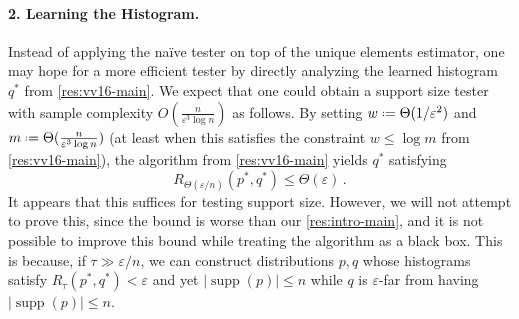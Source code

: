 \documentclass[10pt,a4paper]{article}
\newcommand*\ie{i.\kern.1em e.\ }
\newcommand{\ignore}[1]{}
\DeclareMathOperator{\supp}{supp}   %
\newcommand*{\define}{\mathrel{\vcenter{\baselineskip0.5ex \lineskiplimit0pt
                      \hbox{\scriptsize.}\hbox{\scriptsize.}}}%
                      =}
\renewcommand{\epsilon}{\varepsilon}
\begin{document}
\paragraph*{2. Learning the Histogram.} Instead of applying the na\"ive tester on
top of the unique elements estimator, one may hope for a more efficient tester by directly analyzing
the learned histogram $q^*$ from \cref{res:vv16-main}. We expect that one could obtain a support
size tester with sample complexity $O(\frac{n}{\epsilon^3 \log n})$ as follows. By setting $w
\define \Theta(1/\epsilon^2)$ and $m \define \Theta(\frac{n}{\epsilon^3 \log n})$ (at least when
this satisfies the constraint $w \le \log m$ from \cref{res:vv16-main}), the algorithm from
\cref{res:vv16-main} yields $q^*$ satisfying
\begin{equation}
    \label{eq:remd-bound}
    R_{\Theta(\epsilon/n)}(p^*, q^*) \le \Theta(\epsilon) \,.
\end{equation}
It appears that this suffices for testing support size. However, we will not attempt to prove this,
since the bound is worse than our \cref{res:intro-main}, and it is not possible to improve this
bound while treating the algorithm as a black box. This is because, if $\tau \gg \epsilon/n$, we can
construct distributions $p,q$ whose histograms satisfy $R_\tau(p^*,q^*) < \epsilon$ and yet
$|\supp(p)| \leq n$ while $q$ is $\epsilon$-far from having $|\supp(p)| \leq n$.

\ignore{%
We may construct probability distributions $p$ and $p'$ such that $p$ has support
size $n$, and in particular assigns probability $4\epsilon/n$ to each of $n/2$ elements (for a total
of $2\epsilon$ mass), while $p'$ is obtained from $p$ by splitting each of those $n/2$ elements into
two elements assigned equal probability $2\epsilon/n$, so that $p'$ is $\epsilon$-far from having
support size $n$. The (non-truncated) relative earth-mover distance between $p$ and $p'$ is
$\Theta(\epsilon)$ (and indeed so is the TV distance between them), suggesting that we cannot make
the right-hand side of \eqref{eq:remd-bound} any larger if we wish to distinguish between $p$ and
$p'$, \ie we should set $w = \Omega(1/\epsilon^2)$. Then, if the threshold $\tau$ for the truncated
relative earth-mover distance $R_\tau$ is $\tau \gg \epsilon/n$, the distributions $p$ and $p'$
would be indistinguishable under $R_\tau$, so we must have $\frac{w}{m \log m} = O(\epsilon/n)$.
Since $w = \Omega(1/\epsilon^2)$, we are forced to set $m = \Omega(\frac{n}{\epsilon^3 \log n})$.
}

 
\end{document}
